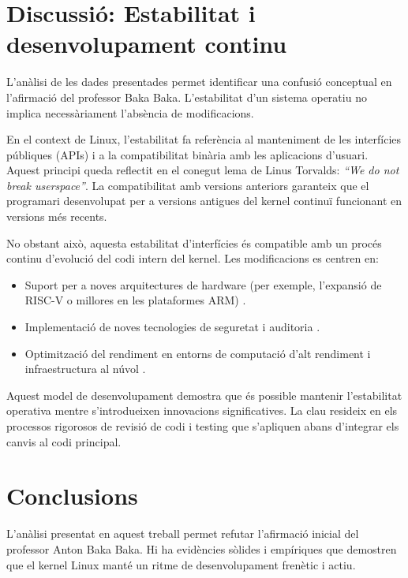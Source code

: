 \documentclass{article}
\begin{document}
\section{Discussió: Estabilitat i desenvolupament continu}

L'anàlisi de les dades presentades permet identificar una confusió conceptual en l'afirmació del professor Baka Baka. L'estabilitat d'un sistema operatiu no implica necessàriament l'absència de modificacions.

En el context de Linux, l'estabilitat fa referència al manteniment de les interfícies públiques (APIs) i a la compatibilitat binària amb les aplicacions d'usuari. Aquest principi queda reflectit en el conegut lema de Linus Torvalds: \textit{``We do not break userspace''}. La compatibilitat amb versions anteriors garanteix que el programari desenvolupat per a versions antigues del kernel continuï funcionant en versions més recents.

No obstant això, aquesta estabilitat d'interfícies és compatible amb un procés continu d'evolució del codi intern del kernel. Les modificacions es centren en:

\begin{itemize}
    \item Suport per a noves arquitectures de hardware (per exemple, l'expansió de RISC-V o millores en les plataformes ARM) \cite{lwn_riscv} \cite{kernelnewbies}.
    \item Implementació de noves tecnologies de seguretat i auditoria \cite{kernel_security_docs}.
    \item Optimització del rendiment en entorns de computació d'alt rendiment i infraestructura al núvol \cite{kernel_performance}.
\end{itemize}

Aquest model de desenvolupament demostra que és possible mantenir l'estabilitat operativa mentre s'introdueixen innovacions significatives. La clau resideix en els processos rigorosos de revisió de codi i testing que s'apliquen abans d'integrar els canvis al codi principal.

\section{Conclusions}

L'anàlisi presentat en aquest treball permet refutar l'afirmació inicial del professor Anton Baka Baka. Hi ha evidències sòlides i empíriques que demostren que el kernel Linux manté un ritme de desenvolupament frenètic i actiu.
\end{document}
